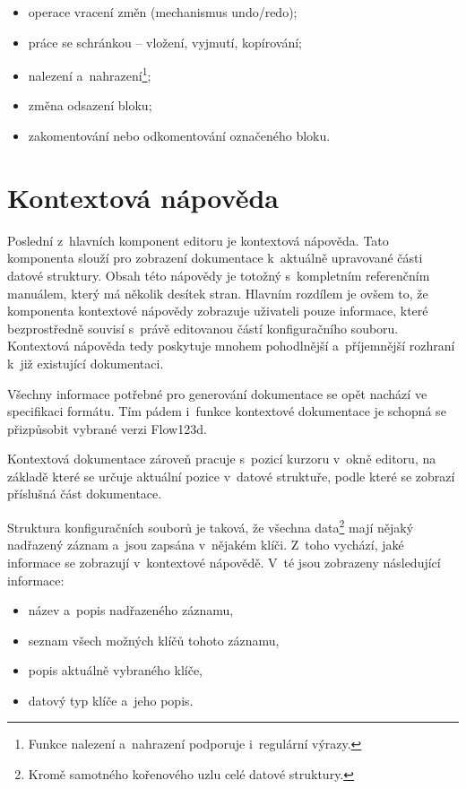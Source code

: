 \documentclass[FM,bw,DP]{tulthesis}
\begin{document}
\begin{itemize}
\item operace vracení změn (mechanismus undo/redo);
\item práce se schránkou -- vložení, vyjmutí, kopírování;
\item nalezení a~nahrazení\footnote{Funkce nalezení a~nahrazení podporuje i~regulární výrazy.};
\item změna odsazení bloku;
\item zakomentování nebo odkomentování označeného bloku.
\end{itemize}


\section{Kontextová nápověda}

Poslední z~hlavních komponent editoru je kontextová nápověda. Tato komponenta slouží pro zobrazení dokumentace k~aktuálně upravované části datové struktury. Obsah této nápovědy je totožný s~kompletním referenčním manuálem, který má několik desítek stran. Hlavním rozdílem je ovšem to, že komponenta kontextové nápovědy zobrazuje uživateli pouze informace, které bezprostředně souvisí s~právě editovanou částí konfiguračního souboru. Kontextová nápověda tedy poskytuje mnohem pohodlnější a~příjemnější rozhraní k~již existující dokumentaci.

Všechny informace potřebné pro generování dokumentace se opět nachází ve specifikaci formátu. Tím pádem i~funkce kontextové dokumentace je schopná se přizpůsobit vybrané verzi Flow123d.

Kontextová dokumentace zároveň pracuje s~pozicí kurzoru v~okně editoru, na základě které se určuje aktuální pozice v~datové struktuře, podle které se zobrazí příslušná část dokumentace.

Struktura konfiguračních souborů je taková, že všechna data\footnote{Kromě samotného kořenového uzlu celé datové struktury.} mají nějaký nad\-řa\-ze\-ný záznam a~jsou zapsána v~nějakém klíči. Z~toho vychází, jaké informace se zobrazují v~kontextové nápovědě. V~té jsou zobrazeny následující informace:

\begin{itemize}
\item název a~popis nadřazeného záznamu,
\item seznam všech možných klíčů tohoto záznamu,
\item popis aktuálně vybraného klíče,
\item datový typ klíče a~jeho popis.
\end{itemize}
\end{document}
